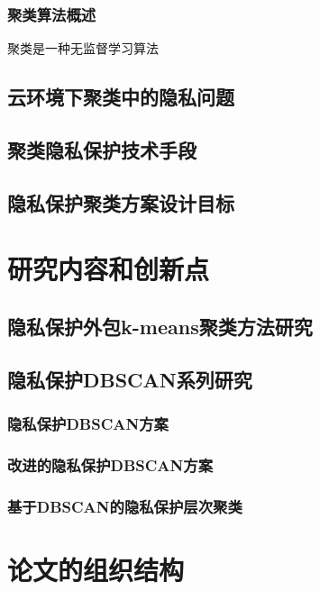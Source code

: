 \subsubsection{聚类算法概述}
聚类是一种无监督学习算法
\subsection{云环境下聚类中的隐私问题}
\subsection{聚类隐私保护技术手段}
\subsection{隐私保护聚类方案设计目标}
\section{研究内容和创新点}
\subsection{隐私保护外包k-means聚类方法研究}
\subsection{隐私保护DBSCAN系列研究}
\subsubsection{隐私保护DBSCAN方案}
\subsubsection{改进的隐私保护DBSCAN方案}
\subsubsection{基于DBSCAN的隐私保护层次聚类}
\section{论文的组织结构}

